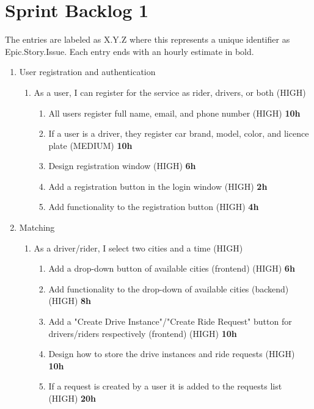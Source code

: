 \documentclass{article}
\begin{document}
\section{Sprint Backlog 1}
The entries are labeled as X.Y.Z where this represents a unique identifier as Epic.Story.Issue. Each entry ends with an hourly estimate in bold.
\begin{enumerate}
  
  \item User registration and authentication
  \begin{enumerate}
    \item As a user, I can register for the service as rider, drivers, or both (HIGH)
    \begin{enumerate}
        \item All users register full name, email, and phone number (HIGH) \textbf{10h}
        \item If a user is a driver, they register car brand, model, color, and licence plate (MEDIUM) \textbf{10h}
        \item Design registration window (HIGH) \textbf{6h}
        \item Add a registration button in the login window (HIGH) \textbf{2h}
        \item Add functionality to the registration button (HIGH) \textbf{4h}
    \end{enumerate}
  \end{enumerate}
  
  \item Matching
  \begin{enumerate}
      \item As a driver/rider, I select two cities and a time (HIGH)
      \begin{enumerate}
          \item Add a drop-down button of available cities (frontend) (HIGH) \textbf{6h}
          \item Add functionality to the drop-down of available cities (backend) (HIGH) \textbf{8h}
          \item Add a "Create Drive Instance"/"Create Ride Request" button for drivers/riders respectively (frontend) (HIGH) \textbf{10h}
          \item Design how to store the drive instances and ride requests (HIGH) \textbf{10h}
          \item If a request is created by a user it is added to the requests list (HIGH) \textbf{20h}
      \end{enumerate}
  \end{enumerate}
\end{enumerate}
\end{document}
